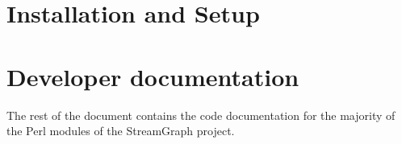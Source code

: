 \documentclass[journal]{IEEEtran}
\begin{document}
\section{Installation and Setup}



\section{Developer documentation}

\noindent The rest of the document contains the code documentation for the
majority of the Perl modules of the StreamGraph project.

\newpage


%

























\end{document}
